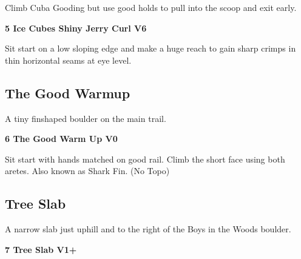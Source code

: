 \begin{multicols}{2}
\begin{adjustwidth}{0.5cm}{}
\begin{minipage}{\linewidth}
							\begin{adjustwidth}{0.5cm}{}				
							Climb Cuba Gooding but use good holds to pull into the scoop and exit early.
							\end{adjustwidth}
							\end{minipage}
						\end{adjustwidth}
					\begin{minipage}{\linewidth}	
					\label{rt:Ice Cubes Shiny Jerry Curl}
\colorbox{RoyalBlue!20}{
\parbox{0.95\textwidth}{
\textbf{
5 Ice Cubes Shiny Jerry Curl V6    
}
}
}

					\begin{adjustwidth}{0.5cm}{}				
					Sit start on a low sloping edge and make a huge reach to gain sharp crimps in thin horizontal seams at eye level.
					\end{adjustwidth}
					\end{minipage}
			\begin{minipage}{\columnwidth}
			\subsection*{The Good Warmup}\label{bf:The Good Warmup}
			A tiny finshaped boulder on the main trail.
			
			\end{minipage}
			
					\begin{minipage}{\linewidth}	
					\label{rt:The Good Warm Up}
\colorbox{green!20}{
\parbox{0.95\textwidth}{
\textbf{
6 The Good Warm Up V0   
}
}
}

					\begin{adjustwidth}{0.5cm}{}				
					Sit start with hands matched on good rail. Climb the short face using both aretes. Also known as Shark Fin.
						\newline (No Topo) 
					\end{adjustwidth}
					\end{minipage}
			\begin{minipage}{\columnwidth}
			\subsection*{Tree Slab}\label{bf:Tree Slab}
			A narrow slab just uphill and to the right of the Boys in the Woods boulder.
			
			\end{minipage}
			
					\begin{minipage}{\linewidth}	
					\label{rt:Tree Slab}
\colorbox{green!20}{
\parbox{0.95\textwidth}{
\textbf{
7 Tree Slab V1+    
}
}
}


\end{minipage}
\end{multicols}
